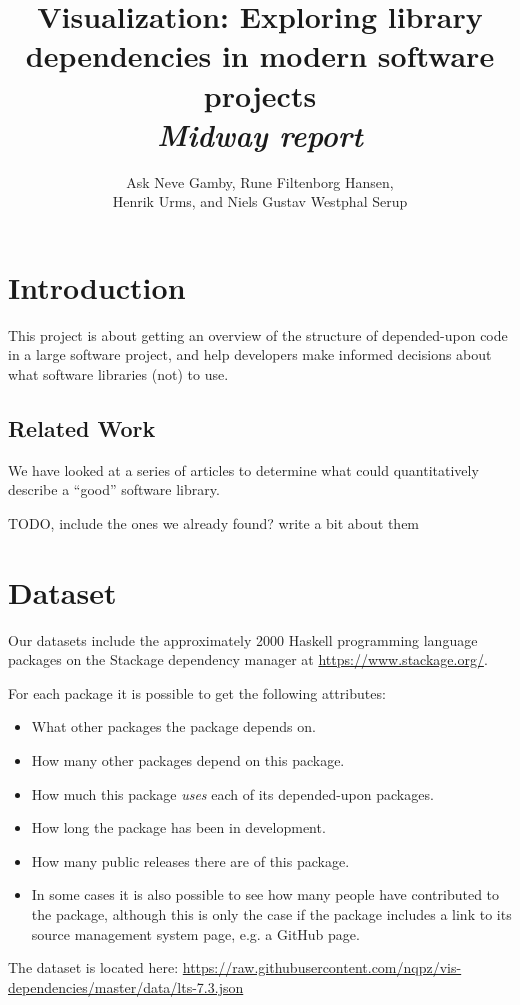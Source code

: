 \documentclass[a4paper,12pt]{article}
\title{\textbf{Visualization}: Exploring library dependencies in modern software projects\\\emph{Midway report}}
\author{Ask Neve Gamby, Rune Filtenborg Hansen,\\
Henrik Urms, and Niels Gustav Westphal Serup}
\begin{document}
\maketitle

\section{Introduction}

This project is about getting an overview of the structure of depended-upon code
in a large software project, and help developers make informed decisions about
what software libraries (not) to use.


\subsection{Related Work}

We have looked at a series of articles to determine what could quantitatively
describe a ``good'' software library.

TODO, include the ones we already found? write a bit about them


\section{Dataset}

Our datasets include the approximately 2000 Haskell programming language
packages on the Stackage dependency manager at \url{https://www.stackage.org/}.

For each package it is possible to get the following attributes:

\begin{itemize}
\item What other packages the package depends on.
\item How many other packages depend on this package.
\item How much this package \emph{uses} each of its depended-upon
packages.
\item How long the package has been in development.
\item How many public releases there are of this package.
\item In some cases it is also possible to see how many people have contributed
to the package, although this is only the case if the package includes a link to
its source management system page, e.g. a GitHub page.
\end{itemize}

The dataset is located here:
\url{https://raw.githubusercontent.com/nqpz/vis-dependencies/master/data/lts-7.3.json}
\end{document}
